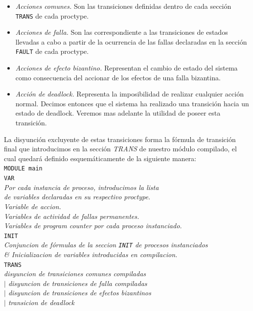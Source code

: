 \documentclass[pdftex,a4paper,12pt]{book}
\begin{document}
\begin{itemize}
\item \textit{Acciones comunes.} Son las transiciones definidas dentro de cada secci\'on \texttt{TRANS} de cada proctype.
\item \textit{Acciones de falla.} Son las correspondiente a las transiciones de estados llevadas a cabo a partir de la ocurrencia de las fallas declaradas en la secci\'on \texttt{FAULT} de cada proctype.
\item \textit{Acciones de efecto bizantino.} Representan el cambio de estado del sistema como consecuencia del accionar de los efectos de una falla bizantina.
\item \textit{Acci\'on de deadlock.} Representa la imposibilidad de realizar cualquier acci\'on normal. Decimos entonces que el sistema ha realizado una transici\'on hacia un estado de deadlock. Veremos mas adelante la utilidad de poseer esta transici\'on.
\end{itemize}
La disyunci\'on excluyente de estas transiciones forma la f\'ormula de transici\'on final que introducimos en la secci\'on \textit{TRANS} de nuestro m\'odulo compilado, el cual quedar\'a definido esquem\'aticamente de la siguiente manera:\\

\noindent \texttt{MODULE main\\
VAR}\textit{\\
\indent    * Por cada instancia de proceso, introducimos la lista \\
\indent      de variables declaradas en su respectivo proctype.\\
\indent    * Variable de accion.\\
\indent    * Variables de actividad de fallas permanentes.\\
\indent    * Variables de program counter por cada proceso instanciado.\\
}\texttt{INIT}\textit{\\
\indent    Conjuncion de f\'ormulas de la seccion \texttt{INIT} de procesos instanciados\\
\indent    \& Inicializacion de variables introducidas en compilacion.\\
}\texttt{TRANS}\textit{\\
\indent    disyuncion de transiciones comunes compiladas \\
\indent    $|$ disyuncion de transiciones de falla compiladas\\ 
\indent    $|$ disyuncion de transiciones de efectos bizantinos\\ 
\indent    $|$ transicion de deadlock
}
\end{document}
